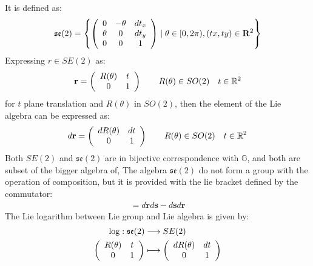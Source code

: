 It is defined as:
\begin{align*}
\mathfrak{se}(2) = 
\left \{
\left (
\begin{array} {c c c }
0 & -\theta &  dt_{x} \\
\theta & 0 & dt_{y} \\
0& 0 & 1
\end{array}
\right )
\mid
\theta \in  [0, 2\pi), (tx, ty) \in\mathbf{R}^2
\right \}
\end{align*}
Expressing $r\in SE(2)$ as:
\begin{align*}
\mathbf{r} = 
\left (
\begin{array} {c c }
R(\theta) & t \\
0 & 1 
\end{array}
\right )
\qquad
R(\theta) \in SO(2) 
\quad
t \in \mathbb{R}^{2}
\end{align*}
for $t$ plane translation and $R(\theta)$ in $SO(2)$, then the element of the Lie algebra can be expressed as:
\begin{align*}
d\mathbf{r} 
= 
\left (
\begin{array} {c c }
dR(\theta) & dt \\
0 & 1 
\end{array}
\right )
\qquad
R(\theta) \in SO(2) 
\quad
t \in \mathbb{R}^{2}
\end{align*}
Both $SE(2)$ and $\mathfrak{se}(2)$ are in bijective correspondence with $\mathbb{G}$, and both are subset of the bigger algebra of, The algebra $\mathfrak{se}(2)$ do not form a group with the operation of composition, but it is provided with the lie bracket defined by the commutator:
\begin{align*}
[d\mathbf{r}, d\mathbf{s}] = d\mathbf{r} d\mathbf{s} - d\mathbf{s} d\mathbf{r}
\end{align*}
The Lie logarithm between Lie group and Lie algebra is given by:
\begin{align*}
\log : \mathfrak{se}(2) & \longrightarrow SE(2)
\\
\left (
\begin{array} {c c }
R(\theta) & t \\
0 & 1 
\end{array}
\right )
&\longmapsto  
\left (
\begin{array} {c c }
dR(\theta) & dt \\
0 & 1 
\end{array}
\right )
\end{align*}
